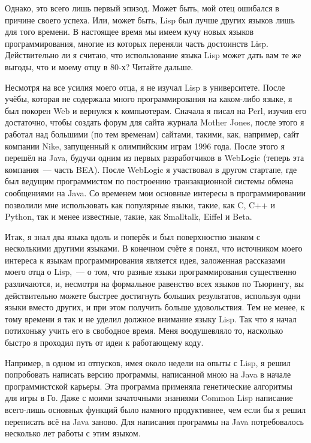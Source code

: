 Однако, это всего лишь первый эпизод. Может быть, мой отец ошибался в причине своего
успеха. Или, может быть, Lisp был лучше других языков лишь для того времени. В настоящее
время мы имеем кучу новых языков программирования, многие из которых переняли часть
достоинств Lisp. Действительно ли я считаю, что использование языка Lisp может дать вам те
же выгоды, что и моему отцу в 80-х? Читайте дальше.

Несмотря на все усилия моего отца, я не изучал Lisp в университете. После учёбы, которая
не содержала много программирования на каком-либо языке, я был покорен Web и вернулся к
компьютерам. Сначала я писал на Perl, изучив его достаточно, чтобы создать форум для сайта
журнала Mother Jones, после этого я работал над большими (по тем временам) сайтами,
такими, как, например, сайт компании Nike, запущенный к олимпийским играм 1996 года. После
этого я перешёл на Java, будучи одним из первых разработчиков в WebLogic (теперь эта
компания~--- часть BEA). После WebLogic я участвовал в другом стартапе, где был ведущим
программистом по построению транзакционной системы обмена сообщениями на Java. Со временем
мои основные интересы в программировании позволили мне использовать как популярные языки,
такие, как C, C++ и Python, так и менее известные, такие, как Smalltalk, Eiffel и Beta.

Итак, я знал два языка вдоль и поперёк и был поверхностно знаком с несколькими другими
языками. В конечном счёте я понял, что источником моего интереса к языкам программирования
является идея, заложенная рассказами моего отца о Lisp,~--- о том, что разные языки
программирования существенно различаются, и, несмотря на формальное равенство всех языков
по Тьюрингу, вы действительно можете быстрее достигнуть больших результатов, используя
одни языки вместо других, и при этом получить больше удовольствия.  Тем не менее, к тому
времени я так и не уделил должное внимание языку Lisp. Так что я начал потихоньку учить
его в свободное время. Меня воодушевляло то, насколько быстро я проходил путь от идеи к
работающему коду.

Например, в одном из отпусков, имея около недели на опыты с Lisp, я решил попробовать
написать версию программы, написанной мною на Java в начале программистской карьеры. Эта
программа применяла генетические алгоритмы для игры в Го. Даже с моими зачаточными
знаниями Common Lisp написание всего-лишь основных функций было намного продуктивнее, чем
если бы я решил переписать всё на Java заново. Для написания программы на Java
потребовалось несколько лет работы с этим языком.

